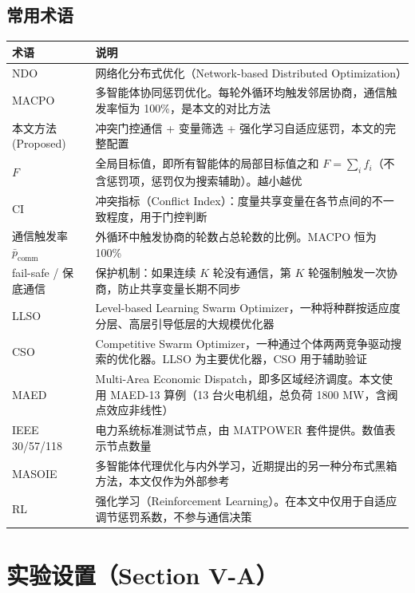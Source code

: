 \documentclass[11pt,a4paper]{ctexart}
\begin{document}
\subsection{常用术语}
\begin{center}\small
\begin{tabular}{@{}p{3.3cm}p{9.7cm}@{}}
\toprule
\textbf{术语} & \textbf{说明} \\
\midrule
NDO & 网络化分布式优化（Network-based Distributed Optimization） \\
MACPO & 多智能体协同惩罚优化\cite{ref_macpo}。每轮外循环均触发邻居协商，通信触发率恒为 100\%，是本文的对比方法 \\
本文方法 (Proposed) & 冲突门控通信 + 变量筛选 + 强化学习自适应惩罚，本文的完整配置 \\
$F$ & 全局目标值，即所有智能体的局部目标值之和 $F=\sum_i f_i$（不含惩罚项，惩罚仅为搜索辅助）。越小越优 \\
CI & 冲突指标（Conflict Index）：度量共享变量在各节点间的不一致程度，用于门控判断 \\
通信触发率 $\bar p_{\mathrm{comm}}$ & 外循环中触发协商的轮数占总轮数的比例。MACPO 恒为 100\% \\
fail-safe / 保底通信 & 保护机制：如果连续 $K$ 轮没有通信，第 $K$ 轮强制触发一次协商，防止共享变量长期不同步 \\
LLSO & Level-based Learning Swarm Optimizer，一种将种群按适应度分层、高层引导低层的大规模优化器\cite{ref_llso} \\
CSO & Competitive Swarm Optimizer，一种通过个体两两竞争驱动搜索的优化器\cite{ref_cso}。LLSO 为主要优化器，CSO 用于辅助验证 \\
MAED & Multi-Area Economic Dispatch，即多区域经济调度。本文使用 MAED-13 算例（13 台火电机组，总负荷 1800 MW，含阀点效应非线性） \\
IEEE 30/57/118 & 电力系统标准测试节点，由 MATPOWER 套件提供。数值表示节点数量 \\
MASOIE & 多智能体代理优化与内外学习\cite{ref_masoie_2024}，近期提出的另一种分布式黑箱方法，本文仅作为外部参考 \\
RL & 强化学习（Reinforcement Learning）。在本文中仅用于自适应调节惩罚系数，不参与通信决策 \\
\bottomrule
\end{tabular}
\end{center}

\section{实验设置（Section V-A）}
\end{document}
